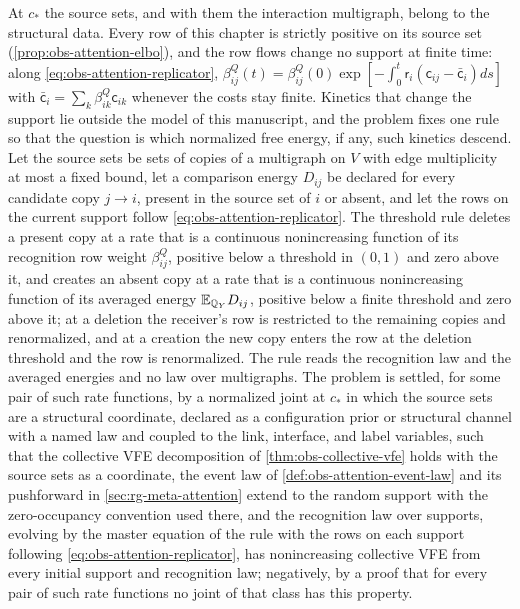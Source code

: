 At \(c_*\) the source sets, and with them the interaction multigraph, belong to
the structural data. Every row of this chapter is strictly positive on its
source set (\cref{prop:obs-attention-elbo}), and the row flows change no support at
finite time: along \eqref{eq:obs-attention-replicator},
\(\beta^Q_{ij}(t)=\beta^Q_{ij}(0)\exp[-\int_0^t\mathsf r_i
(\mathsf c_{ij}-\bar{\mathsf c}_i)ds]\) with
\(\bar{\mathsf c}_i=\sum_k\beta^Q_{ik}\mathsf c_{ik}\) whenever the costs stay
finite. Kinetics that change the support lie outside the model of this
manuscript, and the problem fixes one rule so that the question is which
normalized free energy, if any, such kinetics descend. Let the source sets be
sets of copies of a multigraph on \(V\) with edge multiplicity at most a fixed
bound, let a comparison energy \(D_{ij}\) be declared for every candidate copy
\(j\to i\), present in the source set of \(i\) or absent, and let the rows on the
current support follow
\eqref{eq:obs-attention-replicator}. The threshold rule deletes a present copy
at a rate that is a continuous nonincreasing function of its recognition row
weight \(\beta^Q_{ij}\), positive below a threshold in \((0,1)\) and zero
above it, and creates an absent copy at a rate that is a continuous
nonincreasing function of its averaged energy \(\mathbb E_{\mathbb Q_Y}D_{ij}\),
positive below a finite threshold and zero above it; at a deletion the
receiver's row is restricted to the remaining copies and renormalized, and at
a creation the new copy enters the row at the deletion threshold and the row
is renormalized. The rule reads the recognition law and the averaged
energies and no law over multigraphs. The problem is settled, for some pair
of such rate functions, by a normalized joint at \(c_*\) in which the source
sets are a structural coordinate, declared as a configuration prior or
structural channel with a named law and coupled to the link, interface, and
label variables, such that the collective VFE decomposition of
\cref{thm:obs-collective-vfe} holds with the source sets as a coordinate, the
event law of \cref{def:obs-attention-event-law} and its pushforward in
\cref{sec:rg-meta-attention} extend to the random support with the
zero-occupancy convention used there, and the recognition law over supports,
evolving by the master equation of the rule with the rows on each support
following \eqref{eq:obs-attention-replicator}, has nonincreasing collective
VFE from every initial support and recognition law; negatively, by a proof
that for every pair of such rate functions no joint of that class has this
property.

